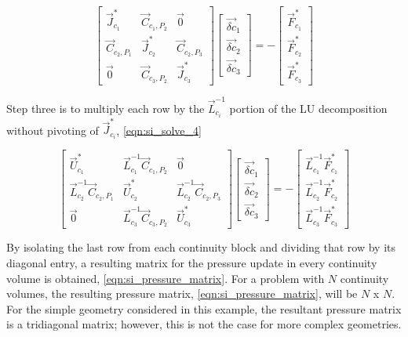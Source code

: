   \begin{equation}
 \label{eqn:si_solve_3}
 \begin{bmatrix} 
 \vec{J}^{*}_{c_1} & \vec{C}_{c_1,P_2} & \vec{0} \\
 \vec{C}_{c_2,P_1} & \vec{J}^{*}_{c_2} & \vec{C}_{c_2,P_3} \\
 \vec{0}           & \vec{C}_{c_3,P_2} & \vec{J}^{*}_{c_3}
 \end{bmatrix} \begin{bmatrix}
 \vec{\delta c}_{1} \\
 \vec{\delta c}_{2} \\
 \vec{\delta c}_{3}
\end{bmatrix}  = -\begin{bmatrix}
 \vec{F}^{*}_{c_1} \\
 \vec{F}^{*}_{c_2} \\
 \vec{F}^{*}_{c_3}
\end{bmatrix}
 \end{equation}

Step three is to multiply each row by the $\vec{L}^{-1}_{c_i}$ portion of the LU decomposition without pivoting of $\vec{J}^{*}_{c_i}$, \eqref{eqn:si_solve_4}

  \begin{equation}
 \label{eqn:si_solve_4}
 \begin{bmatrix} 
 \vec{U}^{*}_{c_1} & \vec{L}^{-1}_{c_1}\vec{C}_{c_1,P_2} & \vec{0} \\
 \vec{L}^{-1}_{c_2}\vec{C}_{c_2,P_1} & \vec{U}^{*}_{c_2} & \vec{L}^{-1}_{c_2}\vec{C}_{c_2,P_3} \\
 \vec{0}           & \vec{L}^{-1}_{c_3}\vec{C}_{c_3,P_2} & \vec{U}^{*}_{c_3}
 \end{bmatrix} \begin{bmatrix}
 \vec{\delta c}_{1} \\
 \vec{\delta c}_{2} \\
 \vec{\delta c}_{3}
\end{bmatrix}  = -\begin{bmatrix}
 \vec{L}^{-1}_{c_1}\vec{F}^{*}_{c_1} \\
 \vec{L}^{-1}_{c_2}\vec{F}^{*}_{c_2} \\
 \vec{L}^{-1}_{c_3}\vec{F}^{*}_{c_3}
\end{bmatrix}
 \end{equation}
 
By isolating the last row from each continuity block and dividing that row by its diagonal entry, a resulting matrix for the pressure update in every continuity volume is obtained, \eqref{eqn:si_pressure_matrix}. 
For a problem with $N$ continuity volumes, the resulting pressure matrix, \eqref{eqn:si_pressure_matrix}, will be $N$ x $N$.
For the simple geometry considered in this example, the resultant pressure matrix is a tridiagonal matrix; however, this is not the case for more complex geometries.

